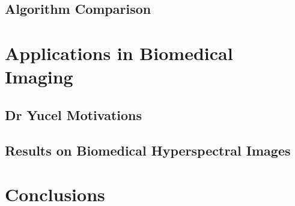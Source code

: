 \documentclass[12pt]{article}
\begin{document}
\clearpage
\subsection{Algorithm Comparison}

\clearpage
% 
% 
% 
% 
% 
\section{Applications in Biomedical Imaging}

\subsection{Dr Yucel Motivations}
\subsection{Results on Biomedical Hyperspectral Images}

\clearpage
% 
% 
% 
% 
% 
\section{Conclusions}
\end{document}
